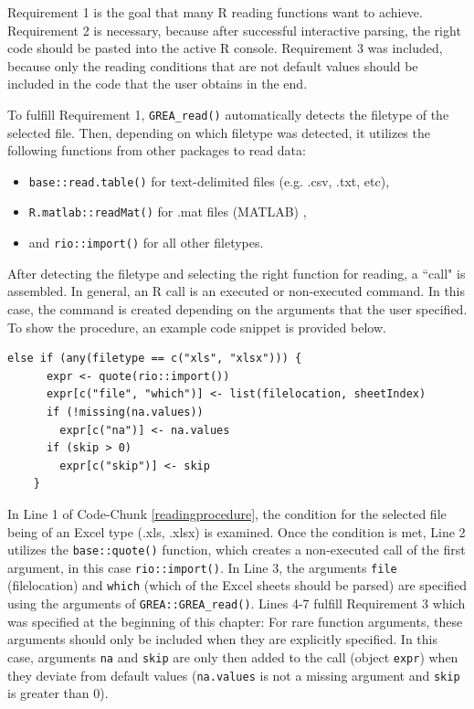 \documentclass[12pt]{article} %
\newcommand{\li}{\lstinline}
\begin{document}
Requirement 1 is the goal that many R reading functions want to achieve. Requirement 2 is necessary, because after successful interactive parsing, the right code should be pasted into the active R console. Requirement 3 was included, because only the reading conditions that are not default values should be included in the code that the user obtains in the end.

To fulfill Requirement 1, \li{GREA_read()} automatically detects the filetype of the selected file. Then, depending on which filetype was detected, it utilizes the following functions from other packages to read data:

\begin{itemize}
\item \li{base::read.table()} for text-delimited files (e.g. .csv, .txt, etc),
\item \li{R.matlab::readMat()} for .mat files (MATLAB) \cite[Bengtsson 2016]{w8},
\item and \li{rio::import()} for all other filetypes.
\end{itemize}

After detecting the filetype and selecting the right function for reading, a ``call" is assembled. In general, an R call is an executed or non-executed command. In this case, the command is created depending on the arguments that the user specified. To show the procedure, an example code snippet is provided below.

\begin{lstlisting}[caption = Reading procedure of \li{GREA_read()}, label = readingprocedure]
else if (any(filetype == c("xls", "xlsx"))) {
      expr <- quote(rio::import())
      expr[c("file", "which")] <- list(filelocation, sheetIndex)
      if (!missing(na.values))
        expr[c("na")] <- na.values
      if (skip > 0)
        expr[c("skip")] <- skip
    }
\end{lstlisting}

In Line 1 of Code-Chunk \ref{readingprocedure}, the condition for the selected file being of an Excel type (.xls, .xlsx) is examined. Once the condition is met, Line 2 utilizes the \li{base::quote()} function, which creates a non-executed call of the first argument, in this case \li{rio::import()}. In Line 3, the arguments \li{file} (filelocation) and \li{which} (which of the Excel sheets should be parsed) are specified using the arguments of \li{GREA::GREA_read()}. Lines 4-7 fulfill Requirement 3 which was specified at the beginning of this chapter: For rare function arguments, these arguments should only be included when they are explicitly specified. In this case, arguments \li{na} and \li{skip} are only then added to the call (object \li{expr}) when they deviate from default values (\li{na.values} is not a missing argument and \li{skip} is greater than 0).
\end{document}
